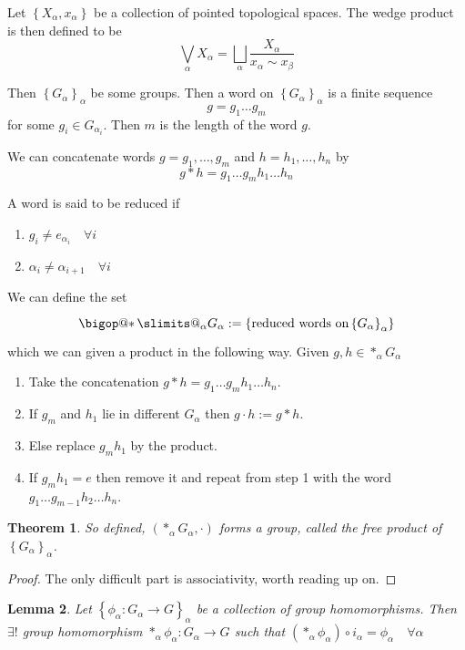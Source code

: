 \documentclass[11pt]{article}
\makeatletter
\newcommand{\defeq}{:=}
\DeclareRobustCommand\bigop[1]{%
  \mathop{\vphantom{\sum}\mathpalette\bigop@{#1}}\slimits@
}
\newcommand{\bigop@}[2]{%
  \vcenter{%
    \sbox\z@{$#1\sum$}%
    \hbox{\resizebox{\ifx#1\displaystyle.9\fi\dimexpr\ht\z@+\dp\z@}{!}{$\m@th#2$}}%
  }%
}
\newcommand{\bigast}{\DOTSB\bigop{\ast}}
\newenvironment{defin}
	{\begin{mdframed}[backgroundcolor=white, roundcorner=5pt, linewidth=1pt]
		\setlength{\parindent}{0pt}
		}
	{\end{mdframed}}
\newcommand{\mdf}[1]{{\color{red} #1}}
\newtheorem{theorem}{Theorem}[section]
\newtheorem{lemma}[theorem]{Lemma}
\makeatother
\begin{document}
\begin{defin}
	Let $\left\{X_\alpha, x_\alpha\right\}$ be a collection of pointed topological spaces.
	The \mdf{wedge product} is then defined to be
	\[
\bigvee_\alpha X_\alpha=\bigsqcup_\alpha \frac{X_\alpha}{x_\alpha\sim x_\beta}
	\]

	Then $\left\{G_\alpha\right\}_\alpha$ be some groups.
	Then a \mdf{word} on $\left\{G_\alpha\right\}_\alpha$ is a finite sequence
	\[
g = g_1 \dots g_m 
	\]
	for some $g_i \in G_{\alpha_i}$.
	Then $m$ is the \mdf{length} of the word $g$.

	We can concatenate words $g=g_1, \dots, g_m$ and $h=h_1, \dots, h_n$ by
	\[
		g\ast h = g_1\dots g_m h_1 \dots h_n
	\]

	A word is said to be \mdf{reduced} if
	\begin{enumerate}[label=(\alph*)]
		\item $g_i\neq e_{\alpha_i}\quad\forall i$
		\item $\alpha_i\neq\alpha_{i+1}\quad\forall i$
	\end{enumerate}

	We can define the set
	\[
		\bigast_\alpha G_\alpha \defeq\left\{\text{reduced words on} \left\{G_\alpha\right\}_\alpha\right\}
	\]
	which we can given a product in the following way.
	Given $g,h\in\ast_\alpha G_\alpha$
	\begin{enumerate}
		\item Take the concatenation $g\ast h=g_1\dots g_m h_1 \dots h_n$.
		\item If $g_m$ and $h_1$ lie in different $G_\alpha$ then $g\cdot h \defeq g\ast h$.
		\item Else replace $g_m h_1$ by the product.
		\item If $g_m h_1=e$ then remove it and repeat from step 1 with the word $g_1\dots g_{m-1} h_2 \dots h_n$.
	\end{enumerate}
\end{defin}

\begin{theorem}
So defined, $(\ast_\alpha G_\alpha, \cdot)$ forms a group, called the \mdf{free product} of $\left\{G_\alpha\right\}_\alpha$.
\end{theorem}

\begin{proof}
The only difficult part is associativity, worth reading up on.
\end{proof}

\begin{lemma}
Let $\left\{\phi_\alpha: G_\alpha\to G \right\}_\alpha$ be a collection of group homomorphisms.
Then $\exists !$ group homomorphism $\ast_\alpha \phi_\alpha: G_\alpha \to G$ such that $\left(\ast_\alpha\phi_\alpha\right)\circ i_\alpha = \phi_\alpha \quad \forall \alpha$
\end{lemma}
\end{document}
